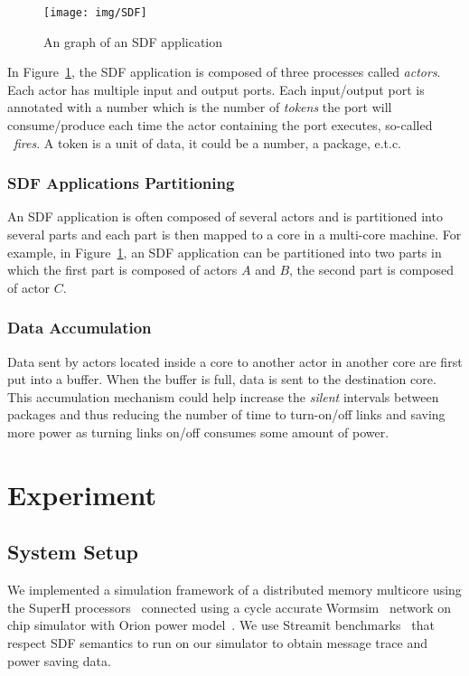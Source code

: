 \documentclass[12pt]{article}
\begin{document}
\begin{figure}[ht!]
\centering
\texttt{[image: img/SDF]}
\caption{An graph of an SDF application}\label{fig:SDF}
\end{figure}

In Figure~\ref{fig:SDF}, the SDF application is composed of three processes
called \textit{actors}. Each actor has multiple input and output ports. Each
input/output port is annotated with a number which is the number of
\textit{tokens} the port will consume/produce each time the actor containing the
port executes, so-called ~\textit{fires}. A token is a unit of data, it could be
a number, a package, e.t.c.

\subsubsection{SDF Applications Partitioning}
An SDF application is often composed of several actors and is partitioned into
several parts and each part is then mapped to a core in a multi-core machine.
For example, in Figure~\ref{fig:SDF}, an SDF application can be partitioned into
two parts in which the first part is composed of actors $A$ and $B$, the second
part is composed of actor $C$.

\subsubsection{Data Accumulation}
Data sent by actors located inside a core to another actor in another core are
first put into a buffer. When the buffer is full, data is sent to the
destination core. This accumulation mechanism could help increase the
\textit{silent} intervals between packages and thus reducing the number of time
to turn-on/off links and saving more power as turning links on/off consumes some
amount of power.


\section{Experiment}
\subsection{System Setup}
We implemented a simulation framework of a distributed memory multicore using
the SuperH processors~\cite{Stanley-MarbellSunflower} connected using a
cycle accurate Wormsim~\cite{Wormsim} network on chip simulator with Orion power
model~\cite{WangOrion}. We use Streamit benchmarks~\cite{ThiesStreamIt} that
respect SDF semantics to run on our simulator to obtain message trace and power
saving data.
\end{document}
